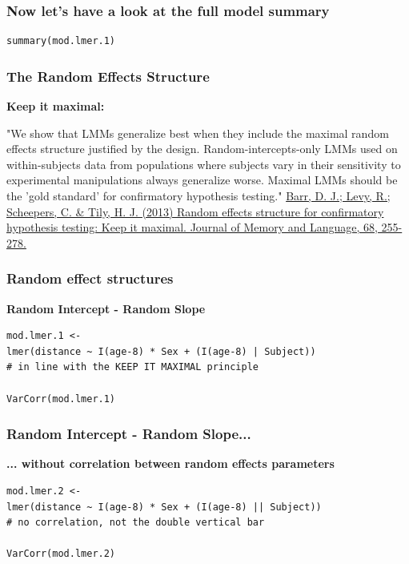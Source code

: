 \documentclass{beamer}
\begin{document}
\begin{frame}[fragile]
    \frametitle{Now let's have a look at the full model summary}
    \small\begin{Verbatim}[frame=single]
summary(mod.lmer.1)
    \end{Verbatim}
    \tiny\scalebox{1}{
        
    }
\end{frame}

\begin{frame}
    \frametitle{The Random Effects Structure}
    \large\textbf{Keep it maximal:}
    \vspace{0.5cm}
    
    \normalsize{"We show that LMMs generalize best when they include the maximal random effects structure justified by the design. Random-intercepts-only LMMs used on within-subjects data from populations where subjects vary in their sensitivity to experimental manipulations always generalize worse. Maximal LMMs should be the 'gold standard' for confirmatory hypothesis testing."}
    \vspace{1cm}
    \small\href{https://europepmc.org/backend/ptpmcrender.fcgi?accid=PMC3881361&blobtype=pdf}{Barr, D. J.; Levy, R.; Scheepers, C. \& Tily, H. J. (2013) Random effects structure for confirmatory hypothesis testing: Keep it maximal. Journal of Memory and Language, 68, 255-278.} 
\end{frame}

\begin{frame}[fragile]
    \frametitle{Random effect structures}
    \textbf{Random Intercept - Random Slope}

    \small\begin{Verbatim}[frame=single]
mod.lmer.1 <- 
lmer(distance ~ I(age-8) * Sex + (I(age-8) | Subject))
# in line with the KEEP IT MAXIMAL principle

VarCorr(mod.lmer.1)
    \end{Verbatim}
    \tiny\scalebox{1}{
        
    }
\end{frame}

\begin{frame}[fragile]
    \frametitle{Random Intercept - Random Slope...}
    \textbf{... without correlation between random effects parameters}
    
    \small\begin{Verbatim}[frame=single]
mod.lmer.2 <- 
lmer(distance ~ I(age-8) * Sex + (I(age-8) || Subject))
# no correlation, not the double vertical bar

VarCorr(mod.lmer.2)
    \end{Verbatim}
    \tiny\scalebox{1}{
        
    }
\end{frame}
\end{document}
